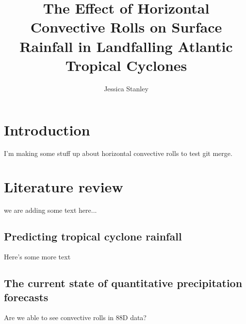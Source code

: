 \documentclass[12pt]{article}
\author{Jessica Stanley} \title{The Effect of Horizontal Convective Rolls on Surface Rainfall in Landfalling Atlantic Tropical Cyclones}
\begin{document}
\maketitle


\section{Introduction}

I'm making some stuff up about horizontal convective rolls to test git merge.

\section{Literature review}

we are adding some text here...

\subsection{Predicting tropical cyclone rainfall} 

Here's some more text

\subsection{The current state of quantitative precipitation forecasts}

Are we able to see convective rolls in 88D data?
\end{document}
